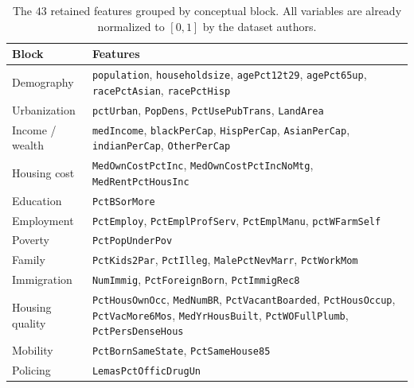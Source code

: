 \documentclass{ieeeaccess}
\begin{document}
\begin{table}[!t]
\caption{The $43$ retained features grouped by conceptual block. All variables are already normalized to $[0,1]$ by the dataset authors.}
\label{tab:features}
\centering
\footnotesize
\begin{tabular}{p{1.55cm}p{6.1cm}}
\toprule
Block & Features \\
\midrule
Demography      & \texttt{population}, \texttt{householdsize}, \texttt{agePct12t29}, \texttt{agePct65up}, \texttt{racePctAsian}, \texttt{racePctHisp} \\
Urbanization    & \texttt{pctUrban}, \texttt{PopDens}, \texttt{PctUsePubTrans}, \texttt{LandArea} \\
Income / wealth & \texttt{medIncome}, \texttt{blackPerCap}, \texttt{HispPerCap}, \texttt{AsianPerCap}, \texttt{indianPerCap}, \texttt{OtherPerCap} \\
Housing cost    & \texttt{MedOwnCostPctInc}, \texttt{MedOwnCostPctIncNoMtg}, \texttt{MedRentPctHousInc} \\
Education       & \texttt{PctBSorMore} \\
Employment      & \texttt{PctEmploy}, \texttt{PctEmplProfServ}, \texttt{PctEmplManu}, \texttt{pctWFarmSelf} \\
Poverty         & \texttt{PctPopUnderPov} \\
Family          & \texttt{PctKids2Par}, \texttt{PctIlleg}, \texttt{MalePctNevMarr}, \texttt{PctWorkMom} \\
Immigration     & \texttt{NumImmig}, \texttt{PctForeignBorn}, \texttt{PctImmigRec8} \\
Housing quality & \texttt{PctHousOwnOcc}, \texttt{MedNumBR}, \texttt{PctVacantBoarded}, \texttt{PctHousOccup}, \texttt{PctVacMore6Mos}, \texttt{MedYrHousBuilt}, \texttt{PctWOFullPlumb}, \texttt{PctPersDenseHous} \\
Mobility        & \texttt{PctBornSameState}, \texttt{PctSameHouse85} \\
Policing        & \texttt{LemasPctOfficDrugUn} \\
\bottomrule
\end{tabular}
\end{table}

\end{document}

